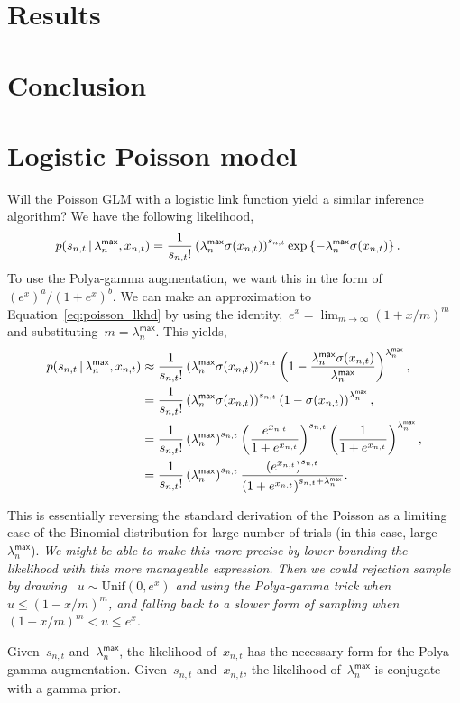 \documentclass[aos]{imsart} %
\begin{document}
\section{Results}

\section{Conclusion}


{\small }

\appendix
\section{Logistic Poisson model}
Will the Poisson GLM with a logistic link function yield a similar inference algorithm? We have the following likelihood,
\begin{align}
\label{eq:poisson_lkhd}
p(s_{n,t} \given \lambda_{n}^{\mathsf{max}}, x_{n,t}) &= \frac{1}{s_{n,t}!} \left(\lambda_{n}^{\mathsf{max}} \sigma(x_{n,t}) \right)^{s_{n,t}}  \exp\left\{-\lambda_{n}^{\mathsf{max}} \sigma(x_{n,t}) \right\}.
\end{align}
To use the Polya-gamma augmentation, we want this in the form of~$(e^x)^a / (1 + e^x)^b$. We can make an approximation to Equation~\ref{eq:poisson_lkhd} by using the identity,~${e^x = \lim_{m\to \infty} (1+x/m)^m}$ and substituting~$m=\lambda_n^{\mathsf{max}}$. This yields,
\begin{align}
p(s_{n,t} \given \lambda_{n}^{\mathsf{max}}, x_{n,t}) &\approx \frac{1}{s_{n,t}!} \left(\lambda_{n}^{\mathsf{max}} \sigma(x_{n,t}) \right)^{s_{n,t}}  \left(1-\frac{\lambda_{n}^{\mathsf{max}} \sigma(x_{n,t})}{\lambda_{n}^{\mathsf{max}}} \right)^{\lambda_{n}^{\mathsf{max}}}, \\
&= \frac{1}{s_{n,t}!} \left(\lambda_{n}^{\mathsf{max}} \sigma(x_{n,t}) \right)^{s_{n,t}}  \left(1-\sigma(x_{n,t}) \right)^{\lambda_{n}^{\mathsf{max}}}, 
\\
&= \frac{1}{s_{n,t}!} \left(\lambda_{n}^{\mathsf{max}}\right)^{s_{n,t}} \left(\frac{e^{x_{n,t}}}{1+e^{x_{n,t}}} \right)^{s_{n,t}}  \left(\frac{1}{1+e^{x_{n,t}}} \right)^{\lambda_{n}^{\mathsf{max}}}, \\ 
&= \frac{1}{s_{n,t}!} \left(\lambda_{n}^{\mathsf{max}}\right)^{s_{n,t}} \frac{\left(e^{x_{n,t}}\right)^{s_{n,t}}}{\left(1+e^{x_{n,t}} \right)^{s_{n,t} + \lambda_{n}^{\mathsf{max}}}}.
\end{align}

This is essentially reversing the standard derivation of the Poisson as a limiting case of the Binomial distribution for large number of trials (in this case, large~$\lambda_n^{\mathsf{max}}$).  \emph{We might be able to make this more precise by lower bounding the likelihood with this more manageable expression. Then we could rejection sample by drawing ~$u\sim\text{Unif}(0,e^x)$  and using the Polya-gamma trick when~$u\leq(1-x/m)^m$, and falling back to a slower form of sampling when~$(1-x/m)^m < u \leq e^x$.}

Given~$s_{n,t}$ and~$\lambda_n^{\mathsf{max}}$, the likelihood of~$x_{n,t}$ has the necessary form for the Polya-gamma augmentation. Given~$s_{n,t}$ and~$x_{n,t}$, the likelihood of~$\lambda_n^{\mathsf{max}}$ is conjugate with a gamma prior.
\end{document}
